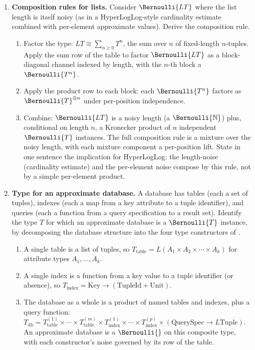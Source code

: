 \begin{enumerate}
\item \exstarstar
\label{ex:ch13-7}
\textbf{Composition rules for lists.}
Consider $\Bernoulli{L T}$ where the list length is itself noisy
(as in a HyperLogLog-style cardinality estimate combined with
per-element approximate values). Derive the composition rule.
\begin{enumerate}
  \item[(a)] Factor the type: $L T \cong \sum_{n \ge 0} T^n$, the
    sum over $n$ of fixed-length $n$-tuples. Apply the sum row of
    the  table to factor
    $\Bernoulli{L T}$ as a block-diagonal channel indexed by length,
    with the $n$-th block a $\Bernoulli{T^n}$.
  \item[(b)] Apply the product row to each block: each
    $\Bernoulli{T^n}$ factors as $\Bernoulli{T}^{\otimes n}$ under
    per-position independence.
  \item[(c)] Combine: $\Bernoulli{L T}$ is a noisy length (a
    $\Bernoulli{\mathbb{N}}$) plus, conditional on length $n$, a
    Kronecker product of $n$ independent $\Bernoulli{T}$ instances.
    The full composition rule is a mixture over the noisy length,
    with each mixture component a per-position lift. State in one
    sentence the implication for HyperLogLog: the length-noise
    (cardinality estimate) and the per-element noise compose by
    this rule, not by a simple per-element product.
\end{enumerate}

\item \exstarstar
\label{ex:ch13-8}
\textbf{Type for an approximate database.}
A database has tables (each a set of tuples), indexes (each a map
from a key attribute to a tuple identifier), and queries (each a
function from a query specification to a result set). Identify the
type $T$ for which an approximate database is a $\Bernoulli{T}$
instance, by decomposing the database structure into the four type
constructors of .
\begin{enumerate}
  \item[(a)] A single table is a list of tuples, so $T_{\text{table}}
    = L (A_1 \times A_2 \times \cdots \times A_k)$ for attribute
    types $A_1, \ldots, A_k$.
  \item[(b)] A single index is a function from a key value to a
    tuple identifier (or absence), so
    $T_{\text{index}} = \text{Key} \to (\text{TupleId} + \text{Unit})$.
  \item[(c)] The database as a whole is a product of named tables
    and indexes, plus a query function: $T_{\text{db}} =
    T_{\text{table}}^{(1)} \times \cdots \times T_{\text{table}}^{(m)}
    \times T_{\text{index}}^{(1)} \times \cdots \times
    T_{\text{index}}^{(p)} \times (\text{QuerySpec} \to L
    \text{Tuple})$. An approximate database is a $\Bernoulli{}$ on
    this composite type, with each constructor's noise governed by
    its row of the  table.
\end{enumerate}


\end{enumerate}
